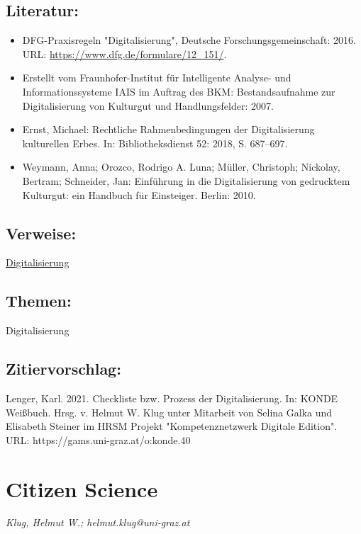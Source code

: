 \documentclass{article}
\begin{document}
        \subsection*{Literatur:}\begin{itemize}\item DFG-Praxisregeln "Digitalisierung", Deutsche Forschungsgemeinschaft: 2016. URL: \url{https://www.dfg.de/formulare/12_151/}.\item Erstellt vom Fraunhofer-Institut für Intelligente Analyse- und
                                 Informationssysteme IAIS im Auftrag des BKM: Bestandsaufnahme zur Digitalisierung von Kulturgut und
                              Handlungsfelder: 2007.\item Ernst, Michael: Rechtliche Rahmenbedingungen der Digitalisierung
                              kulturellen Erbes. In: Bibliotheksdienst 52: 2018, S. 687–697.\item Weymann, Anna; Orozco, Rodrigo A. Luna; Müller, Christoph; Nickolay, Bertram; Schneider, Jan: Einführung in die Digitalisierung von gedrucktem
                              Kulturgut: ein Handbuch für Einsteiger. Berlin: 2010.\end{itemize}\subsection*{Verweise:}\href{https://gams.uni-graz.at/o:konde.60}{Digitalisierung}\subsection*{Themen:}Digitalisierung\subsection*{Zitiervorschlag:}Lenger, Karl. 2021. Checkliste bzw. Prozess der Digitalisierung. In: KONDE Weißbuch. Hrsg. v. Helmut W. Klug unter Mitarbeit von Selina Galka und Elisabeth Steiner im HRSM Projekt "Kompetenznetzwerk Digitale Edition". URL: https://gams.uni-graz.at/o:konde.40\newpage\section*{Citizen Science} \emph{Klug, Helmut W.; helmut.klug@uni-graz.at }\\
        
\end{document}
